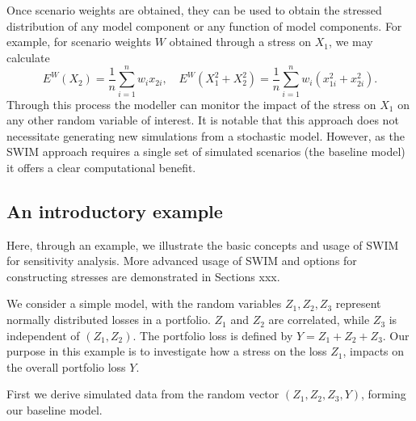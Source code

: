 \documentclass[]{article}
\begin{document}
Once scenario weights are obtained, they can be used to obtain the stressed distribution of any model component or any function of model components. For example, for scenario weights \(W\) obtained through a stress on \(X_1\), we may calculate
\[
E^W(X_2)=\frac 1  n\sum_{i=1}^n w_i x_{2i},\quad E^W(X_1^2+X_2^2)=\frac 1  n \sum_{i=1}^n w_i \left(x_{1i}^2+ x_{2i}^2 \right).
\]
Through this process the modeller can monitor the impact of the stress on \(X_1\) on any other random variable of interest. It is notable that this approach does not necessitate generating new simulations from a stochastic model. However, as the SWIM approach requires a single set of simulated scenarios (the baseline model) it offers a clear computational benefit.

\hypertarget{an-introductory-example}{%
\subsection{An introductory example}\label{an-introductory-example}}

Here, through an example, we illustrate the basic concepts and usage of SWIM for sensitivity analysis. More advanced usage of SWIM and options for constructing stresses are demonstrated in Sections xxx.

We consider a simple model, with the random variables \(Z_1,Z_2,Z_3\) represent normally distributed losses in a portfolio. \(Z_1\) and \(Z_2\) are correlated, while \(Z_3\) is independent of \((Z_1,Z_2)\). The portfolio loss is defined by \(Y=Z_1+Z_2+Z_3\). Our purpose in this example is to investigate how a stress on the loss \(Z_1\), impacts on the overall portfolio loss \(Y\).

First we derive simulated data from the random vector \((Z_1,Z_2,Z_3,Y)\), forming our baseline model.
\end{document}

